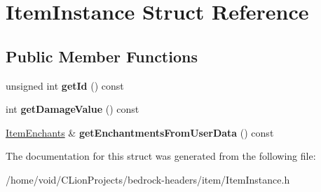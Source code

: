 \hypertarget{struct_item_instance}{}\section{Item\+Instance Struct Reference}
\label{struct_item_instance}
\subsection*{Public Member Functions}
\begin{DoxyCompactItemize}
\item 
\mbox{\label{struct_item_instance_ade4eebf90da5caa8757a95c1ae9072d5}} 
unsigned int {\bfseries get\+Id} () const
\item 
\mbox{\label{struct_item_instance_a8d9d8c4002ab52bb7df2d933246c04b4}} 
int {\bfseries get\+Damage\+Value} () const
\item 
\mbox{\label{struct_item_instance_a46b319e7d069dbe2482a3aecd5aaac28}} 
\mbox{\hyperlink{struct_item_enchants}{Item\+Enchants}} \& {\bfseries get\+Enchantments\+From\+User\+Data} () const
\end{DoxyCompactItemize}


The documentation for this struct was generated from the following file\+:\begin{DoxyCompactItemize}
\item 
/home/void/\+C\+Lion\+Projects/bedrock-\/headers/item/Item\+Instance.\+h\end{DoxyCompactItemize}
